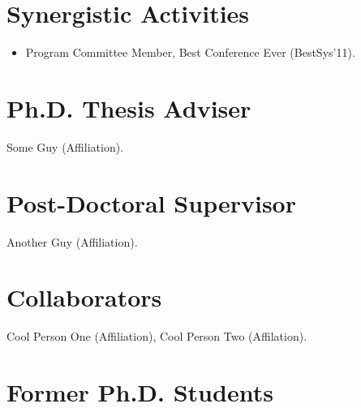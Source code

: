 \section{Synergistic Activities}

\begin{itemize}

\item Program Committee Member, Best Conference Ever (BestSys'11).

\end{itemize}

\section{Ph.D. Thesis Adviser}

Some Guy (Affiliation).

\section{Post-Doctoral Supervisor}

Another Guy (Affiliation).

\section{Collaborators}

Cool Person One (Affiliation), Cool Person Two (Affilation).

\section{Former Ph.D. Students}
